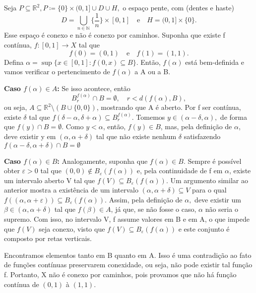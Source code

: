 \documentclass[MetricSpaces/metric_notes.tex]{subfiles}
\begin{document}
\begin{example}
	Seja \(P\subseteq{\mathbb{R}^{2}}, P\coloneqq \{0\}\times (0,1]\cup D\cup H,\) o espaço pente, com (dentes e haste)
	\[
		D = \bigcup_{n\in \mathbb{N}}^{}{\biggl\{\frac{1}{n}\biggr\}\times[0, 1]}\quad\text{e}\quad H = (0, 1]\times\{0\}.
	\]
	Esse espaço é conexo e não é conexo por caminhos. Suponha que existe f contínua, \(f:[0, 1]\rightarrow X\) tal que
	\[
		f(0) = (0, 1)\quad\text{e}\quad f(1) = (1,1).
	\]
	Defina \(\alpha  = \sup{\{x\in[0, 1]: f(0, x)\subseteq{B}\}}\). Então, \(f(\alpha )\) está bem-definida e vamos verificar o pertencimento de \(f(\alpha )\) a A ou a B.

	\textbf{Caso \(f(\alpha )\in A\):}
	Se isso acontece, então
	\[
		B_{r}^{f(\alpha )}\cap B = \emptyset,\quad r < d(f(\alpha ), B),
	\]
	ou seja, \(A\subseteq{\mathbb{R}^{2}}\setminus{(B\cup \{0, 0\})}\), mostrando que A é aberto. Por f ser contínua, existe \(\delta \) tal que
	\(f(\delta -\alpha , \delta +\alpha ) \subseteq{B_{r}^{f(\alpha )}}.\) Tomemos \(y\in (\alpha -\delta , \alpha ),\) de forma que \(f(y)\cap B = \emptyset\).
	Como \(y < \alpha \), então, \(f(y)\in B\), mas, pela definição de \(\alpha \), deve existir y em \((\alpha , \alpha +\delta )\) tal que não existe nenhum \(\delta \)
	satisfazendo \(f(\alpha -\delta ,\alpha +\delta )\cap B = \emptyset \)

	\textbf{Caso \(f(\alpha )\in B\):}
	Analogamente, suponha que \(f(\alpha )\in B\). Sempre é possível obter \(\varepsilon >0\) tal que \((0, 0)\not\in B_{\varepsilon }(f(\alpha ))\) e, pela continuidade
	de f em \(\alpha \), existe um intervalo aberto V tal que \(f(V)\subseteq{B_{\varepsilon }(f(\alpha ))}.\) Um argumento similar ao anterior mostra a existência de
	um intervalo \((\alpha , \alpha +\delta ) \subseteq{V}\) para o qual \(f((\alpha , \alpha +\varepsilon ))\subseteq{B_{\varepsilon }(f(\alpha ))}.\) Assim, pela definição
	de \(\alpha ,\) deve existir um \(\beta \in (\alpha , \alpha +\delta )\) tal que \(f(\beta)\in A\), já que, se não fosse o caso, \(\alpha \) não seria o supremo.
	Com isso, no intervalo V, f assume valores em B e em A, o que impede que \(f(V)\) seja conexo, visto que \(f(V)\subseteq{B_{\varepsilon }(f(\alpha ))}\) e este conjunto
	é composto por retas verticais.

	Encontramos elementos tanto em B quanto em A. Isso é uma contradição ao fato de funções contínuas preservarem conexidade, ou seja, não pode existir tal função f. Portanto,
	X não é conexo por caminhos, pois provamos que não há função contínua de \((0, 1)\) à \((1, 1)\).
\end{example}
\end{document}

